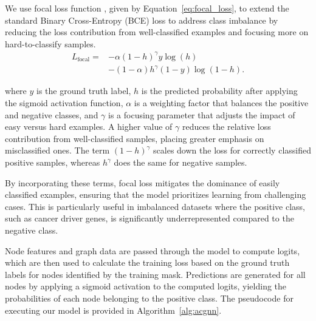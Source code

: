 	We use focal loss function \cite{lin2018focal}, given by Equation~\ref{eq:focal_loss}, to extend the standard Binary Cross-Entropy (BCE) loss to address class imbalance by reducing the loss contribution from well-classified examples and focusing more on hard-to-classify samples.
\begin{equation}
	\begin{aligned}
		L_{\text{focal}} = & - \alpha \left( 1 - h \right)^\gamma y \log(h) \\
		& - (1 - \alpha) h^\gamma (1 - y) \log(1 - h).
	\end{aligned}
	\label{eq:focal_loss}
\end{equation}

where \( y \) is the ground truth label, \( h \) is the predicted probability after applying the sigmoid activation function, \( \alpha \) is a weighting factor that balances the positive and negative classes, and \( \gamma \) is a focusing parameter that adjusts the impact of easy versus hard examples. A higher value of \( \gamma \) reduces the relative loss contribution from well-classified samples, placing greater emphasis on misclassified ones. The term \( (1 - h)^\gamma \) scales down the loss for correctly classified positive samples, whereas \( h^\gamma \) does the same for negative samples.

	
	By incorporating these terms, focal loss mitigates the dominance of easily classified examples, ensuring that the model prioritizes learning from challenging cases. This is particularly useful in imbalanced datasets where the positive class, such as cancer driver genes, is significantly underrepresented compared to the negative class.
	
	Node features and graph data are passed through the model to compute logits, which are then used to calculate the training loss based on the ground truth labels for nodes identified by the training mask. Predictions are generated for all nodes by applying a sigmoid activation to the computed logits, yielding the probabilities of each node belonging to the positive class. The pseudocode for executing our model is provided in Algorithm~\ref{alg:acgnn}.
	

